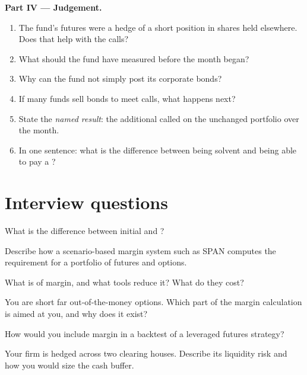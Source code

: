 \begin{problem}
\medskip\noindent\textbf{Part IV --- Judgement.}
\begin{enumerate}[resume]
\item The fund's futures were a hedge of a short position in shares held
elsewhere. Does that help with the calls?
\item What should the fund have measured before the month began?
\item Why can the fund not simply post its corporate bonds?
\item If many funds sell bonds to meet calls, what happens next?
\item State the \emph{named result}: the additional  called on
the unchanged portfolio over the month.
\item In one sentence: what is the difference between being solvent and
being able to pay a ?
\end{enumerate}
\end{problem}

\section{Interview questions}

\begin{interviewq}\label{iq:m1:margin:1}
What is the difference between initial and ?
\end{interviewq}

\begin{interviewq}\label{iq:m1:margin:2}
Describe how a scenario-based margin system such as SPAN computes the
requirement for a portfolio of futures and options.
\end{interviewq}

\begin{interviewq}\label{iq:m1:margin:3}
What is  of margin, and what tools reduce it? What do they
cost?
\end{interviewq}

\begin{interviewq}\label{iq:m1:margin:4}
You are short far out-of-the-money options. Which part of the margin
calculation is aimed at you, and why does it exist?
\end{interviewq}

\begin{interviewq}\label{iq:m1:margin:5}
How would you include margin in a backtest of a leveraged futures strategy?
\end{interviewq}

\begin{interviewq}\label{iq:m1:margin:6}
Your firm is hedged across two clearing houses. Describe its liquidity risk
and how you would size the cash buffer.
\end{interviewq}
